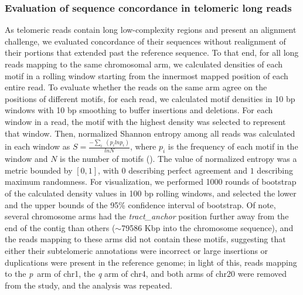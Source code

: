 \documentclass{article}
\newcommand{\citep}[1]{(\cite{#1})}
\begin{document}
\subsubsection*{Evaluation of sequence concordance in telomeric long reads}
As telomeric reads contain long low-complexity regions and present an alignment challenge, we evaluated concordance of their sequences without realignment of their portions that extended past the reference sequence.
To that end, for all long reads mapping to the same chromosomal arm, we calculated densities of each motif in a rolling window starting from the innermost mapped position of each entire read.
To evaluate whether the reads on the same arm agree on the positions of different motifs, for each read, we calculated motif densities in 10 bp windows with 10 bp smoothing to buffer insertions and deletions.
For each window in a read, the motif with the highest density was selected to represent that window.
Then, normalized Shannon entropy among all reads was calculated in each window as $ S = \frac{ - \sum_{i} \; ( p_{i} ln p_{i} )}{ln N} $, where $ p_{i} $ is the frequency of each motif in the window and $ N $ is the number of motifs \citep{hepc_entropy}.
The value of normalized entropy was a metric bounded by $ [ 0, 1 ] $, with $ 0 $ describing perfect agreement and $ 1 $ describing maximum randomness.
For visualization, we performed 1000 rounds of bootstrap of the calculated density values in 100 bp rolling windows, and selected the lower and the upper bounds of the 95\% confidence interval of bootstrap.
Of note, several chromosome arms had the \textit{tract\_anchor} position further away from the end of the contig than others ($\sim$79\textendash{}586 Kbp into the chromosome sequence), and the reads mapping to these arms did not contain these motifs, suggesting that either their subtelomeric annotations were incorrect or large insertions or duplications were present in the reference genome; in light of this, reads mapping to the \mbox{\textit{p} arm} of chr1, the \textit{q} arm of chr4, and both arms of chr20 were removed from the study, and the analysis was repeated.
\end{document}
